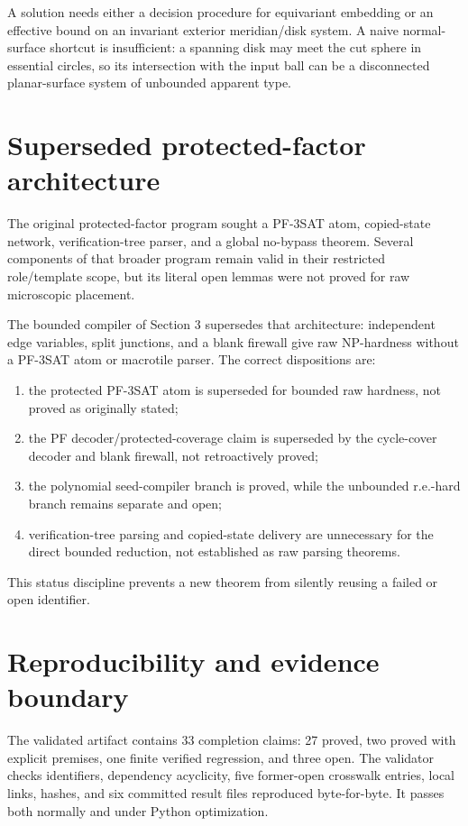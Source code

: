\documentclass[11pt]{article}
\begin{document}
A solution needs either a decision procedure for equivariant embedding or an
effective bound on an invariant exterior meridian/disk system.  A naive
normal-surface shortcut is insufficient: a spanning disk may meet the cut
sphere in essential circles, so its intersection with the input ball can be a
disconnected planar-surface system of unbounded apparent type.

\section{Superseded protected-factor architecture}

The original protected-factor program sought a PF-3SAT atom, copied-state
network, verification-tree parser, and a global no-bypass theorem.  Several
components of that broader program remain valid in their restricted
role/template scope, but its literal open lemmas were not proved for raw
microscopic placement.

The bounded compiler of Section 3 supersedes that architecture: independent
edge variables, split junctions, and a blank firewall give raw NP-hardness
without a PF-3SAT atom or macrotile parser.  The correct dispositions are:

\begin{enumerate}
\item the protected PF-3SAT atom is superseded for bounded raw hardness, not
   proved as originally stated;
\item the PF decoder/protected-coverage claim is superseded by the cycle-cover
   decoder and blank firewall, not retroactively proved;
\item the polynomial seed-compiler branch is proved, while the unbounded
   r.e.-hard branch remains separate and open;
\item verification-tree parsing and copied-state delivery are unnecessary for
   the direct bounded reduction, not established as raw parsing theorems.
\end{enumerate}

This status discipline prevents a new theorem from silently reusing a failed
or open identifier.

\section{Reproducibility and evidence boundary}

The validated artifact contains 33 completion claims: 27 proved, two proved
with explicit premises, one finite verified regression, and three open.  The
validator checks identifiers, dependency acyclicity, five former-open
crosswalk entries, local links, hashes, and six committed result files
reproduced byte-for-byte.  It passes both normally and under Python
optimization.
\end{document}

